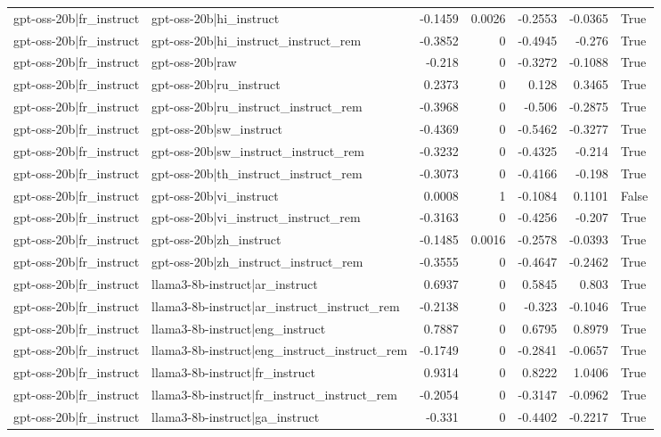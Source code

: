 \begin{table}
\begin{tabular}{l l r r r r l}
gpt-oss-20b|fr_instruct & gpt-oss-20b|hi_instruct & -0.1459 & 0.0026 & -0.2553 & -0.0365 & True \\
gpt-oss-20b|fr_instruct & gpt-oss-20b|hi_instruct_instruct_rem & -0.3852 & 0 & -0.4945 & -0.276 & True \\
gpt-oss-20b|fr_instruct & gpt-oss-20b|raw & -0.218 & 0 & -0.3272 & -0.1088 & True \\
gpt-oss-20b|fr_instruct & gpt-oss-20b|ru_instruct & 0.2373 & 0 & 0.128 & 0.3465 & True \\
gpt-oss-20b|fr_instruct & gpt-oss-20b|ru_instruct_instruct_rem & -0.3968 & 0 & -0.506 & -0.2875 & True \\
gpt-oss-20b|fr_instruct & gpt-oss-20b|sw_instruct & -0.4369 & 0 & -0.5462 & -0.3277 & True \\
gpt-oss-20b|fr_instruct & gpt-oss-20b|sw_instruct_instruct_rem & -0.3232 & 0 & -0.4325 & -0.214 & True \\
gpt-oss-20b|fr_instruct & gpt-oss-20b|th_instruct_instruct_rem & -0.3073 & 0 & -0.4166 & -0.198 & True \\
gpt-oss-20b|fr_instruct & gpt-oss-20b|vi_instruct & 0.0008 & 1 & -0.1084 & 0.1101 & False \\
gpt-oss-20b|fr_instruct & gpt-oss-20b|vi_instruct_instruct_rem & -0.3163 & 0 & -0.4256 & -0.207 & True \\
gpt-oss-20b|fr_instruct & gpt-oss-20b|zh_instruct & -0.1485 & 0.0016 & -0.2578 & -0.0393 & True \\
gpt-oss-20b|fr_instruct & gpt-oss-20b|zh_instruct_instruct_rem & -0.3555 & 0 & -0.4647 & -0.2462 & True \\
gpt-oss-20b|fr_instruct & llama3-8b-instruct|ar_instruct & 0.6937 & 0 & 0.5845 & 0.803 & True \\
gpt-oss-20b|fr_instruct & llama3-8b-instruct|ar_instruct_instruct_rem & -0.2138 & 0 & -0.323 & -0.1046 & True \\
gpt-oss-20b|fr_instruct & llama3-8b-instruct|eng_instruct & 0.7887 & 0 & 0.6795 & 0.8979 & True \\
gpt-oss-20b|fr_instruct & llama3-8b-instruct|eng_instruct_instruct_rem & -0.1749 & 0 & -0.2841 & -0.0657 & True \\
gpt-oss-20b|fr_instruct & llama3-8b-instruct|fr_instruct & 0.9314 & 0 & 0.8222 & 1.0406 & True \\
gpt-oss-20b|fr_instruct & llama3-8b-instruct|fr_instruct_instruct_rem & -0.2054 & 0 & -0.3147 & -0.0962 & True \\
gpt-oss-20b|fr_instruct & llama3-8b-instruct|ga_instruct & -0.331 & 0 & -0.4402 & -0.2217 & True \\

\end{tabular}
\end{table}

